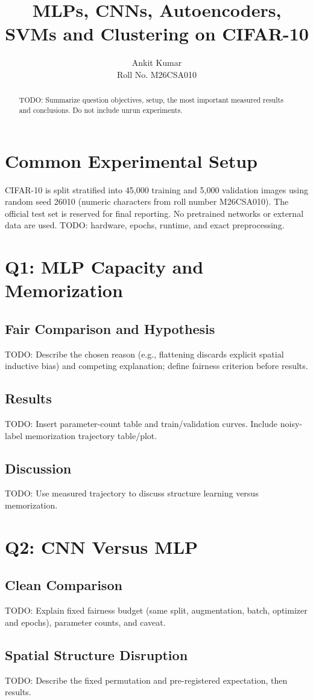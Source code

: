 \documentclass[10pt,twocolumn]{article}
\title{MLPs, CNNs, Autoencoders, SVMs and Clustering on CIFAR-10}
\author{Ankit Kumar\\Roll No. M26CSA010}
\date{}
\begin{document}
\maketitle
\begin{abstract}
TODO: Summarize question objectives, setup, the most important measured results and conclusions. Do not include unrun experiments.
\end{abstract}
\section{Common Experimental Setup}
CIFAR-10 is split stratified into 45,000 training and 5,000 validation images using random seed 26010 (numeric characters from roll number M26CSA010). The official test set is reserved for final reporting. No pretrained networks or external data are used. TODO: hardware, epochs, runtime, and exact preprocessing.
\section{Q1: MLP Capacity and Memorization}
\subsection{Fair Comparison and Hypothesis}
TODO: Describe the chosen reason (e.g., flattening discards explicit spatial inductive bias) and competing explanation; define fairness criterion before results.
\subsection{Results}
TODO: Insert parameter-count table and train/validation curves. Include noisy-label memorization trajectory table/plot.
\subsection{Discussion}
TODO: Use measured trajectory to discuss structure learning versus memorization.
\section{Q2: CNN Versus MLP}
\subsection{Clean Comparison}
TODO: Explain fixed fairness budget (same split, augmentation, batch, optimizer and epochs), parameter counts, and caveat.
\subsection{Spatial Structure Disruption}
TODO: Describe the fixed permutation and pre-registered expectation, then results.
\end{document}

